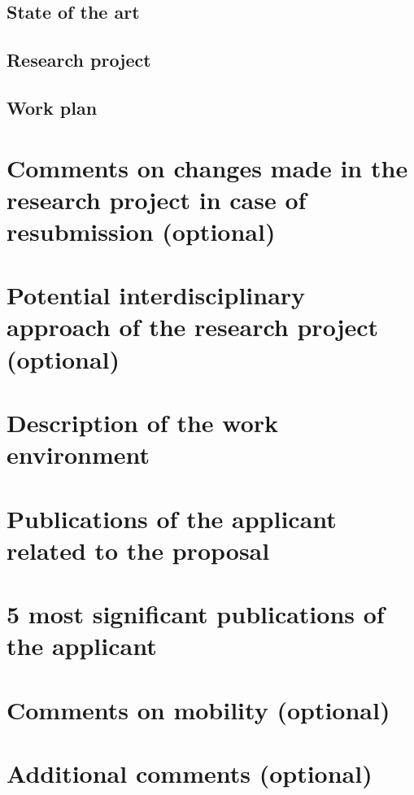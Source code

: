 \documentclass{fnrscq}
\begin{document}
\subsection{State of the art}

\subsection{Research project}

\subsection{Work plan}


\section{Comments on changes made in the research project in case of
  resubmission (optional)}


\section{Potential interdisciplinary approach of the research project\\ (optional)}

\section{Description of the work environment}

\section{Publications of the applicant related to the proposal}
\section{5 most significant publications of the applicant}
\section{Comments on mobility (optional)}
\section{Additional comments (optional)}
\end{document}

